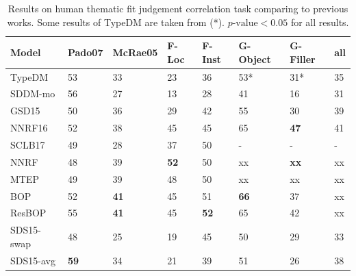\documentclass[a4paper]{article}
\begin{document}
\begin{table}[t]
\centering
\begin{tabular}{l||lllllll}
\textbf{Model} & Pado07       & McRae05     & F-Loc     & F-Inst        &   G-Object    &   G-Filler    &   all     \\ \hline 
TypeDM  &   53      &   33      &   23      &   36          &   53*         &       31*     &   35      \\ 
SDDM-mo &   56      &   27      &   13      &   28          &   41          &       16      &   31      \\ 
GSD15   &   50      &   36      &   29      &   42          &   55                  &       30      &   39      \\
NNRF16  &   52      &   38      &   45      &   45          &   65          & \textbf{47}   &   41      \\  
SCLB17  &   49      &   28      &   37      &   50          &   -           &       -       &   -       \\  \hline 
NNRF    &   48      &   39      &\textbf{52}&   50          &   xx          & \textbf{xx}   &   xx      \\
MTEP    &   49      &   39      &   48      &   50          &   xx          &       xx      &   xx      \\
BOP     &   52      & \textbf{41} & 45      &   51          &   \textbf{66} &       37      &   xx      \\
ResBOP  &   55      & \textbf{41} & 45      &   \textbf{52} &   65          &       42      &   xx      \\  \hline  
SDS15-swap& 48      &   25      &   19      &   45          &   50          &       29      &   33      \\  
SDS15-avg&\textbf{59}&  34      &   21      &   39          &   51          &       26      &   38      \\
\end{tabular}
\caption{\label{tab:eval-thematic} Results on human thematic fit judgement correlation task comparing to previous works. Some results of TypeDM are taken from \citet{greenberg2015verb}(*). $p\text{-value} < 0.05$ for all results. }
\end{table}
\end{document}
